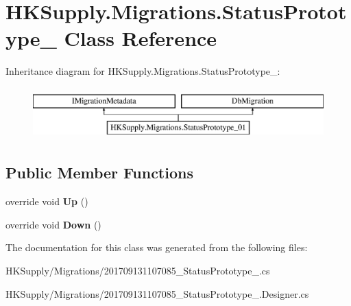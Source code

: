 \hypertarget{class_h_k_supply_1_1_migrations_1_1_status_prototype__01}{}\section{H\+K\+Supply.\+Migrations.\+Status\+Prototype\+\_ Class Reference}
\label{class_h_k_supply_1_1_migrations_1_1_status_prototype__01}
Inheritance diagram for H\+K\+Supply.\+Migrations.\+Status\+Prototype\+\_\+:\begin{figure}[H]
\begin{center}
\leavevmode
\includegraphics[height=2.000000cm]{class_h_k_supply_1_1_migrations_1_1_status_prototype__01}
\end{center}
\end{figure}
\subsection*{Public Member Functions}
\begin{DoxyCompactItemize}
\item 
\mbox{\label{class_h_k_supply_1_1_migrations_1_1_status_prototype__01_af8bd4341a3c31623bc72884a98c8d4d0}} 
override void {\bfseries Up} ()
\item 
\mbox{\label{class_h_k_supply_1_1_migrations_1_1_status_prototype__01_a49300be463672b3492b312a7ee50aa75}} 
override void {\bfseries Down} ()
\end{DoxyCompactItemize}


The documentation for this class was generated from the following files\+:\begin{DoxyCompactItemize}
\item 
H\+K\+Supply/\+Migrations/201709131107085\+\_\+\+Status\+Prototype\+\_.\+cs\item 
H\+K\+Supply/\+Migrations/201709131107085\+\_\+\+Status\+Prototype\+\_.\+Designer.\+cs\end{DoxyCompactItemize}
